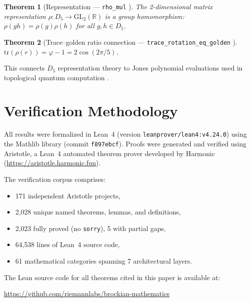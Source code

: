 \documentclass[11pt,a4paper]{article}
\newtheorem{theorem}{Theorem}[section]
\newcommand{\R}{\mathbb{R}}
\newcommand{\lean}[1]{\texttt{\small #1}}
\newcommand{\verified}{\textcolor{green!60!black}{\checkmark}}
\begin{document}
\begin{theorem}[Representation --- \lean{rho\_mul} \verified]\label{thm:rho}
  The 2-dimensional matrix representation $\rho : D_5 \to \mathrm{GL}_2(\R)$
  is a group homomorphism: $\rho(gh) = \rho(g)\rho(h)$ for all $g, h \in D_5$.
\end{theorem}

\begin{theorem}[Trace--golden ratio connection --- \lean{trace\_rotation\_eq\_golden} \verified]\label{thm:trace_rho}
  $\mathrm{tr}(\rho(r)) = \varphi - 1 = 2\cos(2\pi/5)$.
\end{theorem}

This connects $D_5$ representation theory to Jones polynomial evaluations
used in topological quantum computation \cite{freedman2003}.

\section{Verification Methodology}\label{sec:verification}

All results were formalized in Lean~4 (version \texttt{leanprover/lean4:v4.24.0})
using the Mathlib library (commit \texttt{f897ebcf}). Proofs were generated and
verified using Aristotle, a Lean~4 automated theorem prover developed by
Harmonic (\url{https://aristotle.harmonic.fun}).

The verification corpus comprises:
\begin{itemize}
  \item 171 independent Aristotle projects,
  \item 2,028 unique named theorems, lemmas, and definitions,
  \item 2,023 fully proved (no \texttt{sorry}), 5 with partial gaps,
  \item 64,538 lines of Lean~4 source code,
  \item 61 mathematical categories spanning 7 architectural layers.
\end{itemize}

The Lean source code for all theorems cited in this paper is available at:
\begin{center}
  \url{https://github.com/riemannlabs/brockian-mathematics}
\end{center}
\end{document}
